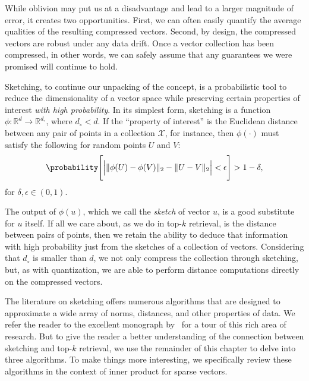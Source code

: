 \begin{svgraybox}
While oblivion may put us at a disadvantage and lead to a larger magnitude of error,
it creates two opportunities. First, we can often easily quantify the
average qualities of the resulting compressed vectors.
Second, by design, the compressed vectors are robust under any data drift.
Once a vector collection has been compressed, in other words, we can safely
assume that any guarantees we were promised will continue to hold.    
\end{svgraybox}

Sketching, to continue our unpacking of the concept, is a probabilistic tool
to reduce the dimensionality of a vector space while preserving
certain properties of interest \emph{with high probability}.
In its simplest form, sketching is a function $\phi: \mathbb{R}^d \rightarrow \mathbb{R}^{d_\circ}$,
where $d_\circ < d$. If the ``property of interest'' is the Euclidean distance
between any pair of points in a collection $\mathcal{X}$, for instance,
then $\phi(\cdot)$ must satisfy the following for random points $U$ and $V$:
\begin{equation*}
    \probability\Bigg[ \Big\lvert \lVert \phi(U) - \phi(V) \rVert_2 - 
    \lVert U - V \rVert_2 \Big\rvert < \epsilon \Bigg] > 1 - \delta,
\end{equation*}
for $\delta, \epsilon \in (0, 1)$.

The output of $\phi(u)$, which we call the \emph{sketch} of vector $u$,
is a good substitute for $u$ itself. If all we care about, as we do in top-$k$
retrieval, is the distance between pairs of points, then we retain the ability
to deduce that information with high probability just from the sketches of a
collection of vectors. Considering that $d_\circ$ is smaller than $d$,
we not only compress the collection through sketching, but, as with quantization,
we are able to perform distance computations directly on the compressed vectors.

\bigskip

The literature on sketching offers numerous algorithms that are designed
to approximate a wide array of norms, distances, and other properties of data.
We refer the reader to the excellent monograph by~\cite{woodruff2014sketching}
for a tour of this rich area of research. But to give the reader a better understanding
of the connection between sketching and top-$k$ retrieval, we use
the remainder of this chapter to delve into three algorithms.
To make things more interesting, we specifically review these algorithms in the
context of inner product for sparse vectors.

